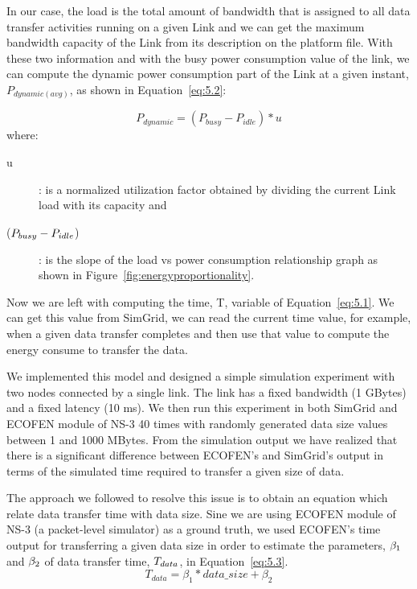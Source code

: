 In our case, the load is the total amount of bandwidth that is assigned to all data transfer activities running on a given Link and we can get the maximum bandwidth capacity of the Link from its description on the platform file. With these two information and with the busy power consumption value of the link, we can compute the dynamic power consumption part of the Link at a given instant, \(P_{dynamic (avg)}\), as shown in Equation~\ref{eq:5.2}:

\begin{equation} \label{eq:5.2}
P_{dynamic} = (P_{busy} - P_{idle}) * u 
\end{equation} 
where:
\begin{description}
    \item [u]: is a normalized utilization factor obtained by dividing the current Link load with its capacity and 
    \item [(\($$P_{busy} - P_{idle}$$\))]: is the slope of the load vs power consumption relationship graph as shown in Figure~\ref{fig:energyproportionality}.
\end{description} 

Now we are left with computing the time, T, variable of Equation~\ref{eq:5.1}. We can get this value from SimGrid, we can read the current time value, for example, when a given data transfer completes and then use that value to compute the energy consume to transfer the data.

We implemented this model and designed a simple simulation experiment with two nodes connected by a single link. The link has a fixed bandwidth (1 GBytes) and a fixed latency (10 ms). We then run this experiment in both SimGrid and ECOFEN module of NS-3 40 times with randomly generated data size values between 1 and 1000 MBytes. From the simulation output we have realized that there is a significant difference between ECOFEN's and SimGrid's output in terms of the simulated time required to transfer a given size of data. 

The approach we followed to resolve this issue is to obtain an equation which relate data transfer time with data size. Sine we are using ECOFEN module of NS-3 (a packet-level simulator) as a ground truth, we used ECOFEN's time output for transferring a given data size in order to estimate the parameters, \($$\beta_1$$\) and \($$\beta_2$$\) of data transfer time, \($$T_{data}$$\), in Equation~\ref{eq:5.3}. 
\begin{equation} \label{eq:5.3}
T_{data} = \beta_1 * data\_size + \beta_2
\end{equation} 

